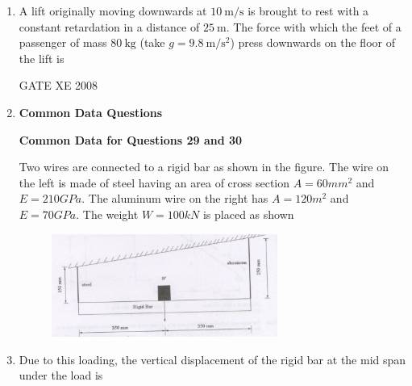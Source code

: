 \documentclass[12pt]{article}
\begin{document}
\begin{enumerate}[label=Q\arabic*.]
    \item A lift originally moving downwards at $10\ \mathrm{m/s}$ is brought to rest with a constant retardation in a distance of $25\ \mathrm{m}$. The force with which the feet of a passenger of mass $80\ \mathrm{kg}$ (take $g = 9.8\ \mathrm{m/s^2}$) press downwards on the floor of the lift is 

\begin{enumerate}[label=(\Alph*)]
\end{enumerate}
    
    GATE XE 2008  

\item[] \textbf{\Large Common Data Questions}

\textbf{Common Data for Questions 29 and 30}

Two wires are connected to a rigid bar as shown in the figure. The wire on the left is made of steel having an area of cross section $A = 60 mm^2$ and $E = 210 GPa$. The aluminum wire on the right has $A = 120 m^2$ and $E = 70 GPa$. The weight $W = 100 kN$ is placed as shown

    \begin{figure}[H]
    \centering
    \includegraphics[width=0.7\textwidth]{figs/ass1_f_q29.png}
    \caption{}
    \end{figure}


\item Due to this loading, the vertical displacement of the rigid bar at the mid span under the load is  

\begin{enumerate}[label=(\Alph*)]
\end{enumerate}


\end{enumerate}
\end{document}
